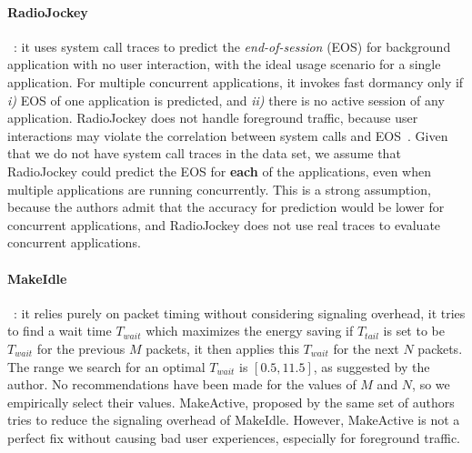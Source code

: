 \paragraph{RadioJockey}~\cite{radiojockey}: it uses system call traces to predict the {\em end-of-session} (EOS) for background application with no user interaction, with the ideal usage scenario for a single application. For multiple concurrent applications, it invokes fast dormancy only if {\em i)} EOS of one application is predicted, and {\em ii)} there is no active session of any application. RadioJockey does not handle foreground traffic, because user interactions may violate the correlation between system calls and EOS~\cite{radiojockey}. Given that we do not have system call traces in the \UMICH data set, we assume that RadioJockey could predict the EOS for {\bf each} of the applications, even when multiple applications are running concurrently. This is a strong assumption, because the authors admit that the accuracy for prediction would be lower for concurrent applications, and RadioJockey does not use real traces to evaluate concurrent applications.

\paragraph{MakeIdle}~\cite{makeidle}: it relies purely on packet timing without considering signaling overhead, \ie it tries to find a wait time $T_{wait}$ which maximizes the energy saving if $T_{tail}$ is set to be $T_{wait}$ for the previous $M$ packets, it then applies this $T_{wait}$ for the next $N$ packets. The range we search for an optimal $T_{wait}$ is $[0.5, 11.5]$, as suggested by the author.  No recommendations have been made for the values of $M$ and $N$, so we empirically select their values. MakeActive, proposed by the same set of authors tries to reduce the signaling overhead of MakeIdle. However, MakeActive is not a perfect fix without causing bad user experiences, especially for foreground traffic.

